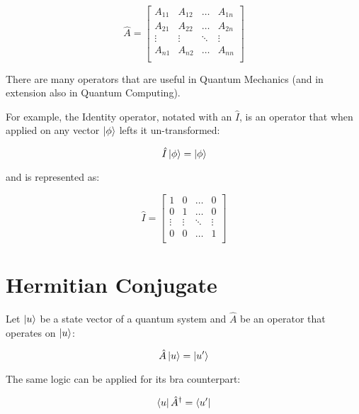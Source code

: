 \begin{equation}
    \hat{A}=\begin{bmatrix}
        A_{11} & A_{12} & \hdots & A_{1n}\\
        A_{21} & A_{22} & \hdots & A_{2n}\\
        \vdots & \vdots & \ddots & \vdots\\
        A_{n1} & A_{n2} & \hdots & A_{nn}\\
    \end{bmatrix}
\end{equation}

There are many operators that are useful in Quantum Mechanics (and in extension also in Quantum Computing).

For example, the Identity operator, notated with an $\hat{I}$, is an operator that when applied on any vector $\ket{\phi}$
lefts it un-transformed:

\begin{equation}
    \hat{I}\ket{\phi}=\ket{\phi}
\end{equation}

and is represented as:

\begin{equation}
    \hat{I}=\begin{bmatrix}
        1 & 0 & \hdots & 0\\
        0 & 1 & \hdots & 0\\
        \vdots & \vdots & \ddots & \vdots\\
        0 & 0 & \hdots & 1\\
    \end{bmatrix}
\end{equation}

\section{Hermitian Conjugate}

Let $\ket{u}$ be a state vector of a quantum system and $\hat{A}$ be an operator that operates on $\ket{u}$:

\begin{equation}
    \hat{A}\ket{u} = \ket{u'}
\end{equation}

The same logic can be applied for its bra counterpart:

\begin{equation}
    \bra{u}\hat{A}^\dag = \bra{u'}
\end{equation}

